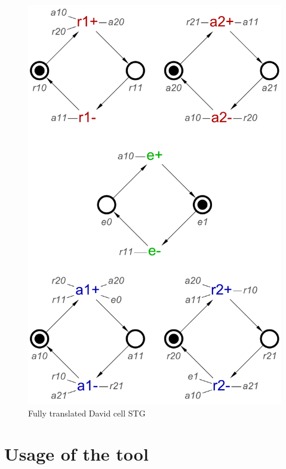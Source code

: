 \documentclass[british,conference,compsoc]{IEEEtran}
\begin{document}
\begin{figure}[h]
\vspace{-4mm}
\begin{centering}
\includegraphics[scale=0.3]{Images/dc-translated-stg}
\par\end{centering}
\protect\caption{\label{fig:dc-stg-translated} Fully translated David cell STG}
\vspace{-5mm}
\end{figure}

\section{Usage of the tool\label{sec:tool-use}}
\end{document}
